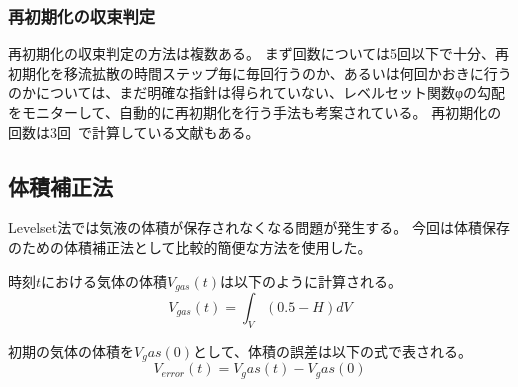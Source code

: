 \begin{comment}
時間ステップは、
\begin{equation}
	\Delta \tau = \Delta x^{1+d} \beta
\end{equation}

インターフェース厚さは、
\begin{equation}
	\epsilon = \Delta x^{1-d} \beta
\end{equation}
ここで変数$\beta$は$0.5$が基本だが、気泡の問題などには薄い界面として0.5より小さい値を用いることも許容する。

式(\ref{CLSM-weakform})をマトリクス形式に変形すると

\subsubsection{高精度保存型レベルセット関数}
CLS関数ではレベルセット法の長所であった界面法線ベクトルや曲率の精度が低下する\cite{Nakazawa2023}
そこでAccurate Conservative LevelSet法(ACLS法)では関数から符号付距離関数$\phi$を再構築し、法線ベクトルや曲率を評価する方法である。
\end{comment}

\subsubsection{再初期化の収束判定}
再初期化の収束判定の方法は複数ある。
まず回数については5回以下で十分、再初期化を移流拡散の時間ステップ毎に毎回行うのか、あるいは何回かおきに行うのかについては、まだ明確な指針は得られていない、レベルセット関数φの勾配をモニターして、自動的に再初期化を行う手法も考案されている。\cite{Okano2016}
再初期化の回数は3回~\cite{Himeno1999}で計算している文献もある。

\subsection{体積補正法}

Levelset法では気液の体積が保存されなくなる問題が発生する。
今回は体積保存のための体積補正法として比較的簡便な方法を使用した。

時刻$t$における気体の体積$V_{gas}(t)$は以下のように計算される。
\begin{equation}
	V_{gas} (t) = \int_{V} (0.5 - H) dV
\end{equation}

初期の気体の体積を$V_gas(0)$として、体積の誤差は以下の式で表される。
\begin{equation}
	V_{error} (t) = V_gas(t) - V_gas(0)
\end{equation}

